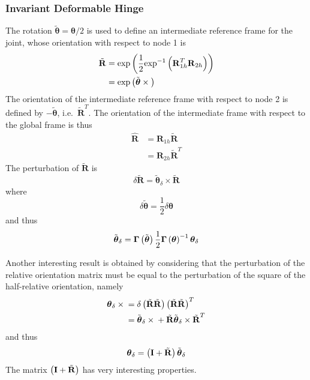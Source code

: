 \documentclass[10pt,dvips,fleqn,subeqn]{report}
\newcommand{\T}[1]{\bm{\mathbf{#1}}}
\begin{document}
\subsubsection{Invariant Deformable Hinge}
\label{sec:deformable-hinge-invariant}
The rotation $\tilde{\T{\theta}}=\T{\theta}/2$
is used to define an intermediate reference frame for the joint,
whose orientation with respect to node 1 is
\begin{align}
	\tilde{\T{R}}
	&= \llk{exp}\plbr{\frac{1}{2}\llk{exp}^{-1}\plbr{\T{R}_{1h}^T \T{R}_{2h}}} \nonumber \\
	&= \llk{exp}\plbr{\tilde{\T{\theta}}\times{}}
\end{align}
The orientation of the intermediate reference frame with respect 
to node 2 is defined by $-\tilde{\T{\theta}}$, i.e.\ $\tilde{\T{R}}^T$.
The orientation of the intermediate frame with respect
to the global frame is thus
\begin{subequations}
\begin{align}
	\hat{\T{R}} &= \T{R}_{1h} \tilde{\T{R}}
		\label{eq:inv-def-h-hatR-1} \\
	&= \T{R}_{2h} \tilde{\T{R}}^T
		\label{eq:inv-def-h-hatR-2}
\end{align}
\end{subequations}
The perturbation of $\tilde{\T{R}}$ is
\begin{equation}
	\delta\tilde{\T{R}} = \tilde{\T{\theta}}_{\delta}\times\tilde{\T{R}}
\end{equation}
where
\begin{equation}
	\delta\tilde{\T{\theta}} = \frac{1}{2} \delta \T{\theta}
\end{equation}
and thus
\begin{equation}
	\tilde{\T{\theta}}_{\delta} = \T{\Gamma}\plbr{\tilde{\T{\theta}}} \frac{1}{2} \T{\Gamma}\plbr{\T{\theta}}^{-1} \T{\theta}_{\delta} 
\end{equation}

Another interesting result is obtained by considering that
the perturbation of the relative orientation matrix
must be equal to the perturbation of the square 
of the half-relative orientation, namely
\begin{align}
	\T{\theta}_{\delta} \times{}
	&= \delta\plbr{\tilde{\T{R}}\tilde{\T{R}}} \plbr{\tilde{\T{R}}\tilde{\T{R}}}^T \nonumber \\
	&= \tilde{\T{\theta}}_{\delta} \times{} + \tilde{\T{R}} \tilde{\T{\theta}}_{\delta} \times \tilde{\T{R}}^T
\end{align}
and thus
\begin{equation}
	\T{\theta}_{\delta} = \plbr{\T{I} + \tilde{\T{R}}} \tilde{\T{\theta}}_{\delta}
	\label{eq:inv-def-h-theta-delta-tilde}
\end{equation}
The matrix $\plbr{\T{I} + \tilde{\T{R}}}$ has very interesting properties.
\end{document}
